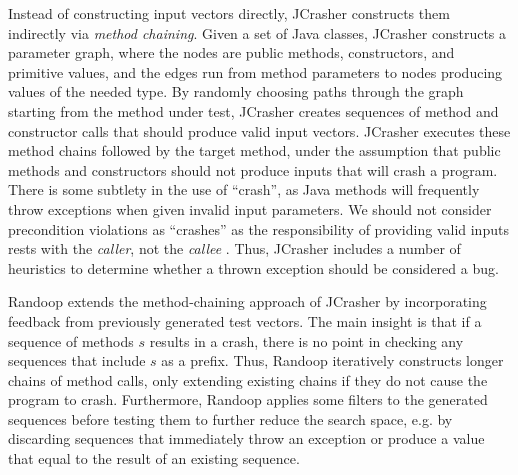 Instead of constructing input vectors directly, JCrasher
\cite{csallner_jcrasher:_2004} constructs them indirectly via
\emph{method chaining}.
%
Given a set of Java classes, JCrasher constructs a parameter graph,
where the nodes are public methods, constructors, and primitive values,
and the edges run from method parameters to nodes producing values of
the needed type.
%
By randomly choosing paths through the graph starting from the method
under test, JCrasher creates sequences of method and constructor calls
that should produce valid input vectors.
%
JCrasher executes these method chains followed by the target method,
under the assumption that public methods and constructors should not
produce inputs that will crash a program.
%
There is some subtlety in the use of ``crash'', as Java methods will
frequently throw exceptions when given invalid input parameters.
%
We should not consider precondition violations as ``crashes'' as the
responsibility of providing valid inputs rests with the \emph{caller},
not the \emph{callee} \cite{meyer_applying_1992}.
%
Thus, JCrasher includes a number of heuristics to determine whether a
thrown exception should be considered a bug.
%

Randoop \cite{pacheco_feedback-directed_2007} extends the
method-chaining approach of JCrasher by incorporating feedback from
previously generated test vectors.
%
The main insight is that if a sequence of methods $s$ results in a
crash, there is no point in checking any sequences that include $s$ as a
prefix.
%
Thus, Randoop iteratively constructs longer chains of method calls, only
extending existing chains if they do not cause the program to
crash.
%
Furthermore, Randoop applies some filters to the generated sequences
before testing them to further reduce the search space, e.g. by
discarding sequences that immediately throw an exception or produce a
value that equal to the result of an existing sequence.

